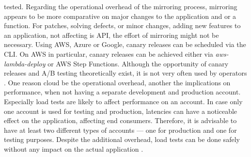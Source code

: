 \documentclass[11pt]{article}
\begin{document}
tested. Regarding the operational overhead of the mirroring process, mirroring appears to be more comparative on major changes to the application and or a function. For patches, solving defects, or minor changes, adding new features to an application, not affecting is API, the effort of mirroring might not be necessary. Using AWS, Azure or Google, canary releases can be scheduled via the CLI. On AWS in particular, canary releases can be achieved either via \textit{aws-lambda-deploy} or AWS Step Functions. Although the opportunity of canary releases and A/B testing theoretically exist, it is not very often used by operators \cite{leitner2019mixed}. One reason cloud be the operational overhead, another the implications on performance, when not having a separate development and production account. Especially load tests are likely to affect performance on an account. In case only one account is used for testing and production, latencies can have a noticeable effect on the application, affecting end consumers. Therefore, it is advisable to have at least two different types of accounts — one for production and one for testing purposes. Despite the additional overhead, load tests can be done safely without any impact on the actual application \cite{leitner2019mixed}.
\end{document}
